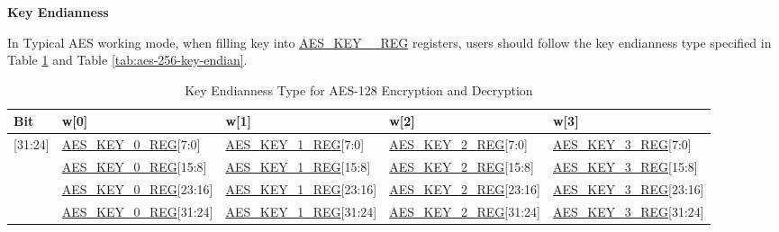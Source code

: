 \documentclass[main\_\_EN.tex]{subfiles}
\begin{document}

\begin{landscape}


\textbf{Key Endianness}

In Typical AES working mode, 
when filling key into \hyperref[regdesc:AESKEYnREG]{AES\_KEY\_\_REG} registers, users should follow the key endianness type specified in Table \ref{tab:aes-128-key-endian} and Table \ref{tab:aes-256-key-endian}.

\begin{table}[H]
    \centering
    \caption{Key Endianness Type for AES-128 Encryption and Decryption}
    \label{tab:aes-128-key-endian}

    \begin{threeparttable}
    \begin{tabular}{ |l|l|l|l|l| }
    \hline
        \rowcolor{lightgray}
        Bit\tnote{1} &   w[0]    &   w[1]    &   w[2]    &   w[3]\tnote{2}     \\\hline
        
        [31:24]     &   \hyperref[regdesc:AESKEYnREG]{AES\_KEY\_0\_REG}[7:0]    &   \hyperref[regdesc:AESKEYnREG]{AES\_KEY\_1\_REG}[7:0]    &   \hyperref[regdesc:AESKEYnREG]{AES\_KEY\_2\_REG}[7:0]    &   \hyperref[regdesc:AESKEYnREG]{AES\_KEY\_3\_REG}[7:0]\\ \hline
        [23:16]     &   \hyperref[regdesc:AESKEYnREG]{AES\_KEY\_0\_REG}[15:8]   &   \hyperref[regdesc:AESKEYnREG]{AES\_KEY\_1\_REG}[15:8]   &   \hyperref[regdesc:AESKEYnREG]{AES\_KEY\_2\_REG}[15:8]   &   \hyperref[regdesc:AESKEYnREG]{AES\_KEY\_3\_REG}[15:8]\\ \hline
        [15:8]  &   \hyperref[regdesc:AESKEYnREG]{AES\_KEY\_0\_REG}[23:16]  &   \hyperref[regdesc:AESKEYnREG]{AES\_KEY\_1\_REG}[23:16]  &   \hyperref[regdesc:AESKEYnREG]{AES\_KEY\_2\_REG}[23:16]  &   \hyperref[regdesc:AESKEYnREG]{AES\_KEY\_3\_REG}[23:16]\\ \hline
        [7:0]   &   \hyperref[regdesc:AESKEYnREG]{AES\_KEY\_0\_REG}[31:24]  &   \hyperref[regdesc:AESKEYnREG]{AES\_KEY\_1\_REG}[31:24]  & \hyperref[regdesc:AESKEYnREG]{AES\_KEY\_2\_REG}[31:24]    &   \hyperref[regdesc:AESKEYnREG]{AES\_KEY\_3\_REG}[31:24]\\ \hline
        \end{tabular}


\end{threeparttable}
\end{table}
\end{landscape}
\end{document}
